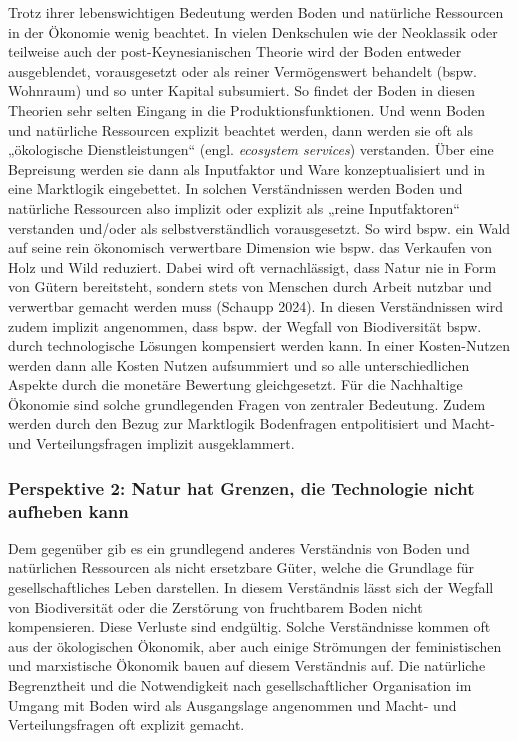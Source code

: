 \documentclass[
  nswissgerman,
  a4paper,
  DIV=11,
  numbers=noendperiod,
  oneside,
  openany]{scrreprt}
\begin{document}
Trotz ihrer lebenswichtigen Bedeutung werden Boden und natürliche
Ressourcen in der Ökonomie wenig beachtet. In vielen Denkschulen wie der
Neoklassik oder teilweise auch der post-Keynesianischen Theorie wird der
Boden entweder ausgeblendet, vorausgesetzt oder als reiner Vermögenswert
behandelt (bspw. Wohnraum) und so unter Kapital subsumiert. So findet
der Boden in diesen Theorien sehr selten Eingang in die
Produktionsfunktionen. Und wenn Boden und natürliche Ressourcen explizit
beachtet werden, dann werden sie oft als „ökologische Dienstleistungen``
(engl. \emph{ecosystem services}) verstanden. Über eine Bepreisung
werden sie dann als Inputfaktor und Ware konzeptualisiert und in eine
Marktlogik eingebettet. In solchen Verständnissen werden Boden und
natürliche Ressourcen also implizit oder explizit als „reine
Inputfaktoren`` verstanden und/oder als selbstverständlich
vorausgesetzt. So wird bspw. ein Wald auf seine rein ökonomisch
verwertbare Dimension wie bspw. das Verkaufen von Holz und Wild
reduziert. Dabei wird oft vernachlässigt, dass Natur nie in Form von
Gütern bereitsteht, sondern stets von Menschen durch Arbeit nutzbar und
verwertbar gemacht werden muss (Schaupp 2024). In diesen Verständnissen
wird zudem implizit angenommen, dass bspw. der Wegfall von Biodiversität
bspw. durch technologische Lösungen kompensiert werden kann. In einer
Kosten-Nutzen werden dann alle Kosten Nutzen aufsummiert und so alle
unterschiedlichen Aspekte durch die monetäre Bewertung gleichgesetzt.
Für die Nachhaltige Ökonomie sind solche grundlegenden Fragen von
zentraler Bedeutung. Zudem werden durch den Bezug zur Marktlogik
Bodenfragen entpolitisiert und Macht- und Verteilungsfragen implizit
ausgeklammert.

\subsubsection{Perspektive 2: Natur hat Grenzen, die Technologie nicht
aufheben
kann}\label{perspektive-2-natur-hat-grenzen-die-technologie-nicht-aufheben-kann}

Dem gegenüber gib es ein grundlegend anderes Verständnis von Boden und
natürlichen Ressourcen als nicht ersetzbare Güter, welche die Grundlage
für gesellschaftliches Leben darstellen. In diesem Verständnis lässt
sich der Wegfall von Biodiversität oder die Zerstörung von fruchtbarem
Boden nicht kompensieren. Diese Verluste sind endgültig. Solche
Verständnisse kommen oft aus der ökologischen Ökonomik, aber auch einige
Strömungen der feministischen und marxistische Ökonomik bauen auf diesem
Verständnis auf. Die natürliche Begrenztheit und die Notwendigkeit nach
gesellschaftlicher Organisation im Umgang mit Boden wird als
Ausgangslage angenommen und Macht- und Verteilungsfragen oft explizit
gemacht.
\end{document}
